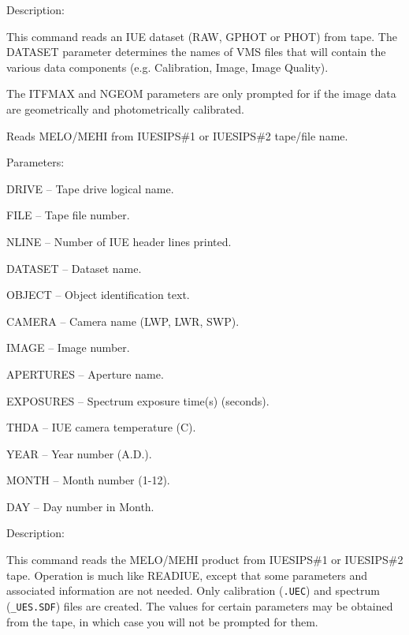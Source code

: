 \begin {description}
\begin {description}
\item Description:

This command reads an IUE dataset (RAW, GPHOT or PHOT) from tape.
The DATASET parameter determines the names of VMS files that
will contain the various data components (e.g. Calibration, Image,
Image Quality).

The ITFMAX and NGEOM parameters are only prompted for if the image
data are geometrically and photometrically calibrated.
\end {description}

\item [READSIPS]
Reads MELO/MEHI from IUESIPS\#1 or IUESIPS\#2 tape/file name.

\begin {description}
\item Parameters:

\begin {description}
\item DRIVE -- Tape drive logical name.
\item FILE -- Tape file number.
\item NLINE -- Number of IUE header lines printed.
\item DATASET -- Dataset name.
\item OBJECT -- Object identification text.
\item CAMERA -- Camera name (LWP, LWR, SWP).
\item IMAGE -- Image number.
\item APERTURES -- Aperture name.
\item EXPOSURES -- Spectrum exposure time(s) (seconds).
\item THDA -- IUE camera temperature (C).
\item YEAR -- Year number (A.D.).
\item MONTH -- Month number (1-12).
\item DAY -- Day number in Month.
\end {description}

\item Description:

This command reads the MELO/MEHI product from IUESIPS\#1 or IUESIPS\#2
tape. Operation is much like READIUE, except that some parameters and
associated information are not needed. Only calibration ({\tt .UEC})
and spectrum ({\tt \_UES.SDF}) files are created. The values for
certain parameters may be obtained from the tape, in which case you
will not be prompted for them. 

\end {description}


\end{description}
